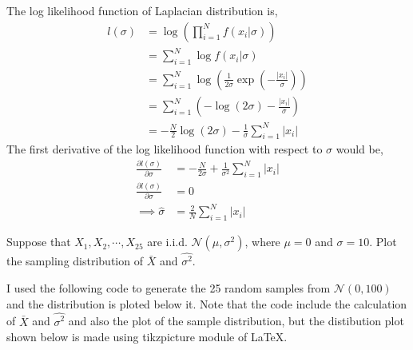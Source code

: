\documentclass[addpoints]{exam}
\theoremstyle{mytheoremstyle}
\theoremstyle{mytheoremstyle}
\theoremstyle{myproblemstyle}
\begin{document}
\begin{questions}
\begin{parts}
		\begin{solution}
			The log likelihood function of Laplacian distribution is,
			\begin{align*}
				l(\sigma) & =\log \left(\prod_{i=1}^{N} f(x_{i}|\sigma)\right)                                            \\
				          & =\sum_{i=1}^{N} \log f(x_{i}|\sigma)                                                          \\
				          & =\sum_{i=1}^{N} \log \left(\frac{1}{2\sigma}\exp{\left(-\frac{|x_{i}|}{\sigma}\right)}\right) \\
				          & =\sum_{i=1}^{N} \left(-\log{(2\sigma)}-\frac{|x_{i}|}{\sigma}\right)                          \\
				          & =-\frac{N}{2}\log{(2\sigma)}-\frac{1}{\sigma}\sum_{i=1}^{N}|x_{i}|
			\end{align*}
			The first derivative of the log likelihood function with respect to \(\sigma\) would be,
			\begin{align*}
				\frac{\partial l(\sigma)}{\partial \sigma} & =-\frac{N}{2\sigma}+\frac{1}{\sigma^{2}}\sum_{i=1}^{N}|x_{i}| \\
				\frac{\partial l(\sigma)}{\partial \sigma} & =0                                                            \\
				\implies \hat{\sigma}                      & =\frac{2}{N}\sum_{i=1}^{N}|x_{i}|
			\end{align*}
		\end{solution}
	\end{parts}


	\question Suppose that \(X_{1},X_{2},\cdots,X_{25}\) are i.i.d. \(\mathcal{N}(\mu,\sigma^{2})\), where \(\mu=0\) and \(\sigma=10\). Plot the sampling distribution of \(\bar{X}\) and \(\hat{\sigma^{2}}\).

	\begin{solution}
		I used the following code to generate the 25 random samples from \(\mathcal{N}(0,100)\) and the distribution is ploted below it. Note that the code include the calculation of \(\bar{X}\) and \(\hat{\sigma^{2}}\) and also the plot of the sample distribution, but the distibution plot shown below is made using tikzpicture module of \LaTeX.
		


		\begin{center}
		\end{center}
	\end{solution}


\end{questions}
\end{document}
